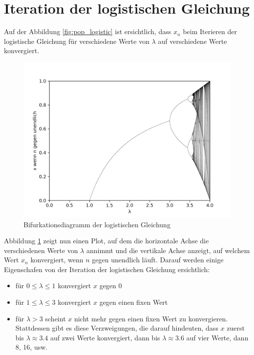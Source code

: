 %
%
%
\section{Iteration der logistischen Gleichung
\label{logistic:section:problemstellung}}

Auf der Abbildung \ref{fig:pop_logistic} ist ersichtlich, 
dass $x_n$ beim Iterieren der logistische Gleichung
für verschiedene Werte von $\lambda$ auf verschiedene
Werte konvergiert. 

\begin{figure}
    \includegraphics[width=\linewidth]{papers/logistic/figures/map.png}
    \caption{Bifurkationsdiagramm der logistischen Gleichung}
    \label{fig:map_1}
\end{figure}

Abbildung \ref{fig:map_1} zeigt nun einen Plot, 
auf dem die horizontale Achse die verschiedenen Werte
von $\lambda$ annimmt und die vertikale Achse anzeigt,
auf welchem Wert $x_n$ konvergiert, wenn $n$ gegen
unendlich läuft. Darauf werden einige Eigenschafen 
von der Iteration der logistischen Gleichung ersichtlich:

\begin{itemize}
    \item 
    für $0 \le \lambda \le 1$ konvergiert $x$ gegen 0
    \item 
    für $1 \le \lambda \le 3$ konvergiert $x$ gegen einen fixen Wert
    \item 
    für $\lambda > 3$ scheint $x$ nicht mehr gegen einen fixen Wert zu konvergieren.
    Stattdessen gibt es diese Verzweigungen, 
    die darauf hindeuten, 
    dass $x$ zuerst bis $\lambda \approx 3.4$ auf zwei Werte konvergiert, 
    dann bis $\lambda \approx 3.6$ auf vier Werte, dann 8, 16, usw. 
\end{itemize}

